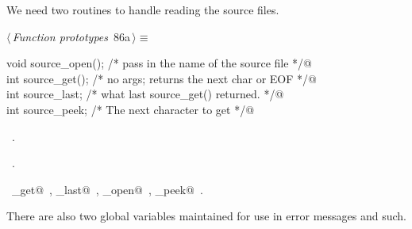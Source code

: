 \documentclass[a4paper]{report}
\begin{document}
We need two routines to handle reading the source files.
\begin{flushleft} \small
\begin{minipage}{\linewidth}\label{scrap176}\raggedright\small
{} $\langle\,${\it Function prototypes}\nobreak\ {\footnotesize {86a}}$\,\rangle\equiv$
\vspace{-1ex}
\begin{list}{}{} \item
\mbox{}\verb@extern void source_open(); /* pass in the name of the source file */@\\
\mbox{}\verb@extern int source_get();   /* no args; returns the next char or EOF */@\\
\mbox{}\verb@extern int source_last;   /* what last source_get() returned. */@\\
\mbox{}\verb@extern int source_peek;   /* The next character to get */@\\
\mbox{}\verb@@{\NWsep}
\end{list}
\vspace{-1.5ex}
\footnotesize
\begin{list}{}{\setlength{\itemsep}{-\parsep}\setlength{\itemindent}{-\leftmargin}}
\item \NWtxtMacroDefBy\ .
\item \NWtxtMacroRefIn\ .
\item \NWtxtIdentsUsed\nobreak\  \verb@source_get@\nobreak\ , \verb@source_last@\nobreak\ , \verb@source_open@\nobreak\ , \verb@source_peek@\nobreak\ .
\item{}
\end{list}
\end{minipage}\vspace{4ex}
\end{flushleft}
There are also two global variables maintained for use in error
messages and such.
\end{document}
